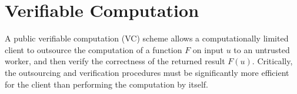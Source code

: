 \documentclass[lnbip]{svmultln}
\begin{document}




\section{Verifiable Computation}

A public verifiable computation (VC) scheme allows a computationally limited client to outsource the computation of a function $F$ on input $u$ to an untrusted worker, and then verify the correctness of the returned result $F(u)$. Critically, the outsourcing and verification procedures must be significantly more efficient for the client than performing the computation by itself.\cite{parno2012delegate} \
\end{document}
